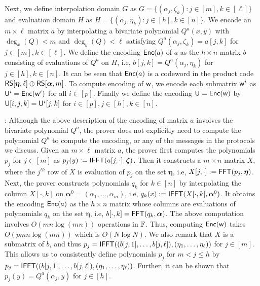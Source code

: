 Next, we define interpolation domain $G$ as $G=\{(\alpha_j,\zeta_k): j\in[m],
k\in [\ell]\}$ and evaluation domain $H$ as $H=\{(\alpha_j,\eta_k): j\in [h],
k\in [n]\}$. We encode an $m\times \ell$ matrix $a$ by interpolating a
bivariate polynomial $Q^a(x,y)$ with $\deg_x(Q)<m$ and $\deg_y(Q)<\ell$
satisfying $Q^a(\alpha_j,\zeta_k)=a[j,k]$ for $j\in [m],k\in [\ell]$. We define
the encoding $\mathsf{Enc}(a)$ of $a$ as the $h\times n$ matrix $b$ consisting of
evaluations of $Q^a$ on $H$, i.e, $b[j,k]=Q^a(\alpha_j,\eta_k)$ for $j\in
[h],k\in [n]$. It can be seen that $\mathsf{Enc}(a)$ is a codeword in the product code
$\mathsf{RS}[\bm{\eta},\ell]\oplus \mathsf{RS}[\bm{\alpha},m]$. To compute encoding of $\mathsf{w}$, we
encode each submatrix $\mathsf{w}^i$ as $\mathsf{U}^i=\mathsf{Enc}(\mathsf{w}^i)$ for all $i\in [p]$.
Finally we define the encoding $\mathsf{U}=\mathsf{Enc}(\mathsf{w})$ by $\mathsf{U}[i,j,k]=\mathsf{U}^i[j,k]$
for $i\in [p], j\in [h], k\in [n]$.\medskip

: Although the above
description of the encoding of matrix $a$ involves the bivariate polynomial
$Q^a$, the prover does not explicitly need to compute the polynomial $Q^a$ to compute the
encoding, or any of the messages in the protocols we discuss. Given an $m\times \ell$
matrix $a$, the prover first computes the polynomials $p_j$ for $j\in
[m]$ as $p_j(y) := \mathsf{IFFT}(a[j,\cdot], \bm{\zeta})$. Then it constructs a $m\times n$
matrix $X$, where the $j^{th}$ row of $X$ is evaluation of $p_j$ on the set
$\bm{\eta}$, i.e, $X[j,\cdot] := \mathsf{FFT}(p_j, \bm{\eta})$. Next, the prover constructs
polynomials $q_k$ for $k\in [n]$ by interpolating the column $X[\cdot,k]$ on
$\bm{\alpha}^0 = (\alpha_1,\ldots,\alpha_m)$, i.e, $q_k(x) := \mathsf{IFFT}(X[\cdot,k],
\bm{\alpha}^0)$. It obtains the encoding $\mathsf{Enc}(a)$ as the $h\times n$ matrix
whose columns are evaluations of polynomials $q_k$ on the set $\bm{\eta}$, i.e,
$b[\cdot,k]=\mathsf{FFT}(q_k,\bm{\alpha})$. The above computation involves
$O(mn\log(mn))$ operations in $\mathbb{F}$. Thus, computing $\mathsf{Enc}(\mathsf{w})$ takes
$O(pmn\log(mn))$ which is $O(N\log{N})$. We also remark that $X$ is a submatrix
of $b$, and thus
$p_j=\mathsf{IFFT}((b[j,1],\ldots,b[j,\ell]),(\eta_1,\ldots,\eta_{\ell}))$ for $j\in
[m]$. This allows us to consistently define polynomials $p_j$ for $m<j\leq h$ by
$p_j=\mathsf{IFFT}((b[j,1],\ldots,b[j,\ell]),(\eta_1,\ldots,\eta_{\ell}))$. Further, it
can be shown that $p_j(y)=Q^a(\alpha_j,y)$ for $j\in [h]$.\medskip


